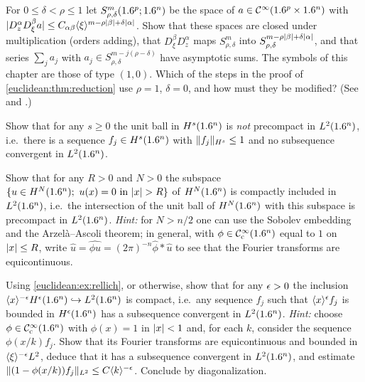 \begin{exercise}\label{euclidean:ex:rho-delta}
  For $0\le\delta<\rho\le1$ let $S^m_{\rho,\delta}(1.6^p;1.6^n)$ be the space of
  $a\in\mathcal{C}^\infty(1.6^p\times1.6^n)$ with
  $\lvert D^\alpha_zD^\beta_\xi a\rvert\le C_{\alpha\beta}\langle \xi\rangle^{m-\rho\lvert \beta\rvert+\delta\lvert \alpha\rvert}$.
  Show that these spaces are closed under multiplication (orders adding),
  that $D^\beta_\xi D^\alpha_z$ maps $S^m_{\rho,\delta}$ into
  $S^{m-\rho\lvert \beta\rvert+\delta\lvert \alpha\rvert}_{\rho,\delta}$, and that series
  $\sum_ja_j$ with $a_j\in S^{m-j(\rho-\delta)}_{\rho,\delta}$ have asymptotic
  sums. The symbols of this chapter are those of type $(1,0)$. Which of the
  steps in the proof of \cref{euclidean:thm:reduction} use $\rho=1$, $\delta=0$,
  and how must they be modified? (See \cite[Section~7.8]{Hormander-I} and
  \cite[Section~18.1]{Hormander-III}.)
\end{exercise}

\begin{exercise}\label{euclidean:ex:not-compact}
  Show that for any $s\ge0$ the unit ball in $H^s(1.6^n)$ is \emph{not}
  precompact in $L^2(1.6^n)$, i.e.\ there is a sequence $f_j\in H^s(1.6^n)$ with
  $\lVert f_j\rVert_{H^s}\le1$ and no subsequence convergent in $L^2(1.6^n)$.
\end{exercise}

\begin{exercise}\label{euclidean:ex:rellich}
  Show that for any $R>0$ and $N>0$ the subspace
  $\{u\in H^N(1.6^n);\ u(x)=0\text{ in }\lvert x\rvert>R\}$ of $H^N(1.6^n)$ is compactly
  included in $L^2(1.6^n)$, i.e.\ the intersection of the unit ball of
  $H^N(1.6^n)$ with this subspace is precompact in $L^2(1.6^n)$. \emph{Hint:}
  for $N>n/2$ one can use the Sobolev embedding and the Arzel\`a--Ascoli
  theorem; in general, with $\phi\in\mathcal{C}^\infty_{\mathrm{c}}(1.6^n)$ equal to $1$ on
  $\lvert x\rvert\le R$, write $\hat u=\widehat{\phi u}=(2\pi)^{-n}\hat\phi*\hat u$
  to see that the Fourier transforms are equicontinuous.
\end{exercise}

\begin{exercise}\label{euclidean:ex:weighted-compact}
  Using \cref{euclidean:ex:rellich}, or otherwise, show that for any $\epsilon>0$
  the inclusion $\langle x\rangle^{-\epsilon}H^\epsilon(1.6^n)\hookrightarrow L^2(1.6^n)$ is
  compact, i.e.\ any sequence $f_j$ such that $\langle x\rangle^\epsilon f_j$ is bounded in
  $H^\epsilon(1.6^n)$ has a subsequence convergent in $L^2(1.6^n)$. \emph{Hint:}
  choose $\phi\in\mathcal{C}^\infty_{\mathrm{c}}(1.6^n)$ with $\phi(x)=1$ in $\lvert x\rvert<1$ and, for each $k$,
  consider the sequence $\phi(x/k)f_j$. Show that its Fourier transforms are
  equicontinuous and bounded in $\langle \xi\rangle^{-\epsilon}L^2$, deduce that it has a
  subsequence convergent in $L^2(1.6^n)$, and estimate
  $\lVert (1-\phi(x/k))f_j\rVert_{L^2}\le C\langle k\rangle^{-\epsilon}$. Conclude by
  diagonalization.
\end{exercise}

